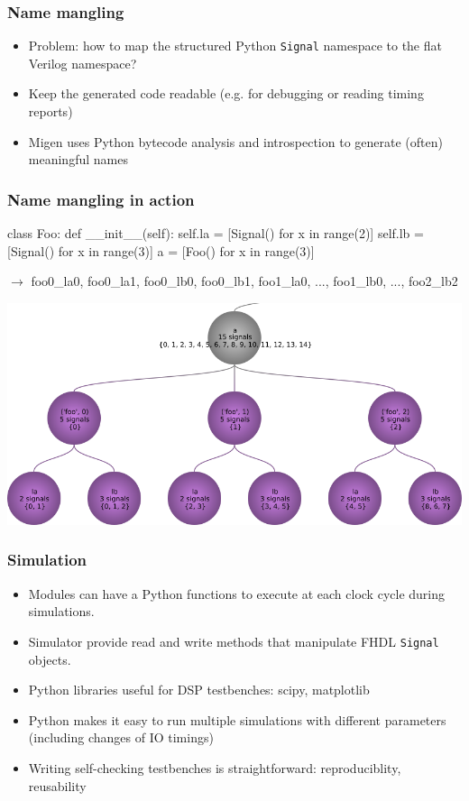 \documentclass{beamer}
\begin{document}
\begin{frame}[fragile]
\frametitle{Name mangling}
\begin{itemize}
\item Problem: how to map the structured Python \verb!Signal! namespace to the flat Verilog namespace?
\item Keep the generated code readable (e.g. for debugging or reading timing reports)
\item Migen uses Python bytecode analysis and introspection to generate (often) meaningful names
\end{itemize}
\end{frame}

\begin{frame}[fragile]
\frametitle{Name mangling in action}
\begin{verbatimtab}
class Foo:
    def __init__(self):
        self.la = [Signal() for x in range(2)]
        self.lb = [Signal() for x in range(3)]
a = [Foo() for x in range(3)]
\end{verbatimtab}

$\rightarrow$ foo0\_la0, foo0\_la1, foo0\_lb0, foo0\_lb1, foo1\_la0, ...,
  foo1\_lb0, ..., foo2\_lb2
\end{frame}

\begin{frame}
\centering \includegraphics[width=\textwidth]{name_mangling.png}
\end{frame}

\begin{frame}[fragile]
\frametitle{Simulation}
\begin{itemize}
\item Modules can have a Python functions to execute at each clock cycle during simulations.
\item Simulator provide read and write methods that manipulate FHDL \verb!Signal! objects.
\item Python libraries useful for DSP testbenches: scipy, matplotlib
\item Python makes it easy to run multiple simulations with different parameters (including changes of IO timings)
\item Writing self-checking testbenches is straightforward: reproduciblity, reusability
\end{itemize}
\end{frame}
\end{document}
